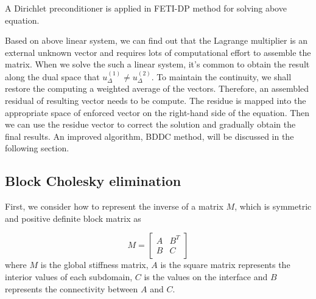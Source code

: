 A Dirichlet preconditioner is applied in FETI-DP method for solving above equation. 

Based on above linear system, we can find out that the Lagrange multiplier is an external unknown vector and requires lots of computational effort to assemble the matrix. When we solve the such a linear system, it's common to obtain the result along the dual space that $ u_{\Delta}^{(1)} \neq  u_{\Delta}^{(2)}$. To maintain the continuity, we shall restore the computing a weighted average of the vectors. Therefore, an assembled residual of resulting vector needs to be compute. The residue is mapped into the appropriate space of enforced vector on the right-hand side of the equation. Then we can use the residue vector to correct the solution and gradually obtain the final results. An improved algorithm, BDDC method, will be discussed in the following section.

\subsection{Block Cholesky elimination}

First, we consider how to represent the inverse of a matrix $ M $, which is symmetric and positive definite block matrix as

\begin{equation}\label{eq:linearSys}
M = \begin{bmatrix}
A & B^{T} \\
B & C\\
\end{bmatrix}
\end{equation}
where $ M $ is the global stiffness matrix, $ A $ is the square matrix represents the interior values of each subdomain, $ C $ is the values on the interface and $ B $ represents the connectivity between $ A $ and $ C $.

